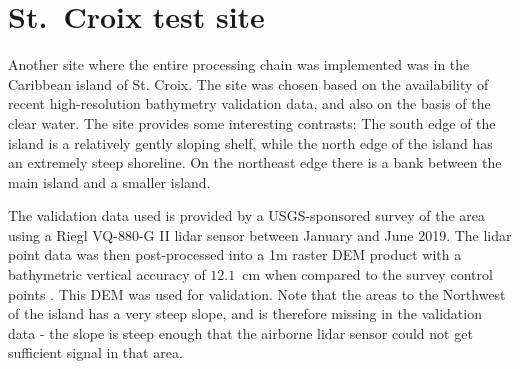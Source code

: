 \begin{figure}[!ht]
    \begin{floatrow}
    \end{floatrow}
\end{figure}

\section{St.~Croix test site} \label{sec:stcroix-site}

Another site where the entire processing chain was implemented was in the Caribbean island of St. Croix. The site was chosen based on the availability of recent high-resolution bathymetry validation data, and also on the basis of the clear water. The site provides some interesting contrasts: The south edge of the island is a relatively gently sloping shelf, while the north edge of the island has an extremely steep shoreline. On the northeast edge there is a bank between the main island and a smaller island.

The validation data used is provided by a USGS-sponsored survey of the area using a Riegl VQ-880-G II lidar sensor between January and June 2019. The lidar point data was then post-processed into a 1m raster DEM product with a bathymetric vertical accuracy of $12.1$~cm when compared to the survey control points \parencite{USVI-lidar2022}. This DEM was used for validation. Note that the areas to the Northwest of the island has a very steep slope, and is therefore missing in the validation data - the slope is steep enough that the airborne lidar sensor could not get sufficient signal in that area.

